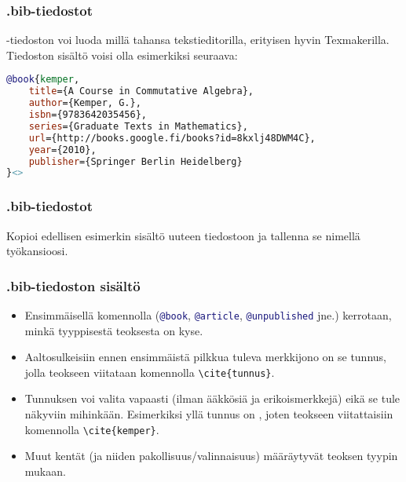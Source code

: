 \begin{fframe}
    \frametitle{.bib-tiedostot}
    -tiedoston voi luoda millä tahansa tekstieditorilla, erityisen hyvin Texmakerilla. 
    \vaihto
    Tiedoston sisältö voisi olla esimerkiksi seuraava:\vaihto
    \begin{lstlisting}[language=BibTeX,basicstyle=\ttfamily\small]
@book{kemper,
    title={A Course in Commutative Algebra},
    author={Kemper, G.},
    isbn={9783642035456},
    series={Graduate Texts in Mathematics},
    url={http://books.google.fi/books?id=8kxlj48DWM4C},
    year={2010},
    publisher={Springer Berlin Heidelberg}
}<>
    \end{lstlisting}
\end{fframe}

\begin{fframe}
    \frametitle{.bib-tiedostot}
    \begin{harj}
        Kopioi edellisen esimerkin sisältö uuteen tiedostoon ja tallenna se nimellä  työkansioosi. 
    \end{harj}
\end{fframe}

\begin{fframe}
    \frametitle{.bib-tiedoston sisältö}
    \begin{itemize}
        \item Ensimmäisellä komennolla (\lstinline[language=BibTeX]-@book-, \lstinline[language=BibTeX]-@article-, \lstinline[language=BibTeX]-@unpublished- jne.) kerrotaan, minkä tyyppisestä teoksesta on kyse. 
        \item Aaltosulkeisiin ennen ensimmäistä pilkkua tuleva merkkijono on se tunnus, jolla teokseen viitataan komennolla \lstinline-\cite{tunnus}-. 
        \item Tunnuksen voi valita vapaasti (ilman ääkkösiä ja erikoismerkkejä) eikä se tule näkyviin mihinkään.  Esimerkiksi yllä tunnus on , joten teokseen viitattaisiin komennolla \lstinline-\cite{kemper}-.
        \item Muut kentät (ja niiden pakollisuus/valinnaisuus) määräytyvät teoksen tyypin mukaan.
    \end{itemize}
\end{fframe}

